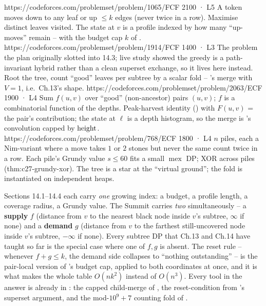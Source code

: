 \begin{mixedset}
    {https://codeforces.com/problemset/problem/1065/F}{CF 2100 · L5}
    {A token moves down to any leaf or up $\le k$ edges (never twice in a row). Maximise distinct leaves visited. The state at $v$ is a profile indexed by how many ``up-moves'' remain --  with the budget cap $k$ of .}
    {https://codeforces.com/problemset/problem/1914/F}{CF 1400 · L3}
    {The problem the plan originally slotted into 14.3; live study showed the greedy is a path-invariant hybrid rather than a clean superset exchange, so it lives here instead. Root the tree, count ``good'' leaves per subtree by a scalar fold -- 's merge with $V=1$, i.e.~Ch.13's shape.}
    {https://codeforces.com/problemset/problem/2063/E}{CF 1900 · L4}
    {Sum $f(u,v)$ over ``good'' (non-ancestor) pairs $(u,v)$; $f$ is a combinatorial function of the depths. Peak-harvest identity () with $F(u,v)$ = the pair's contribution; the state at $\ell$ is a depth histogram, so the merge is 's convolution capped by $\operatorname{height}$.}
    {https://codeforces.com/problemset/problem/768/E}{CF 1800 · L4}
    {$n$ piles, each a Nim-variant where a move takes $1$ or $2$ stones but never the same count twice in a row. Each pile's Grundy value $s \le 60$ fits a small $\operatorname{mex}$ DP; XOR across piles (thm:c27-grundy-xor). The tree is a star at the ``virtual ground''; the fold is  instantiated on independent heaps.}
\end{mixedset}



\begin{notebox}
Sections 14.1--14.4 each carry \emph{one} growing index: a budget, a
profile length, a coverage radius, a Grundy value. The Summit carries
\emph{two} simultaneously -- a \textbf{supply} $f$ (distance from $v$ to
the nearest black node inside $v$'s subtree, $\infty$ if none) and a
\textbf{demand} $g$ (distance from $v$ to the farthest still-uncovered
node inside $v$'s subtree, $-\infty$ if none). Every subtree DP that Ch.13
and Ch.14 have taught so far is the special case where one of $f, g$ is
absent. The reset rule -- whenever $f + g \le k$, the demand side collapses
to ``nothing outstanding'' -- is the pair-local version of
's budget cap, applied to both coordinates at once,
and it is what makes the whole table $O(nk^2)$ instead of $O(n^3)$. Every
tool in the answer is already in : the capped child-merge
of , the reset-condition from 's
superset argument, and the mod-$10^9{+}7$ counting fold of .
\end{notebox}

